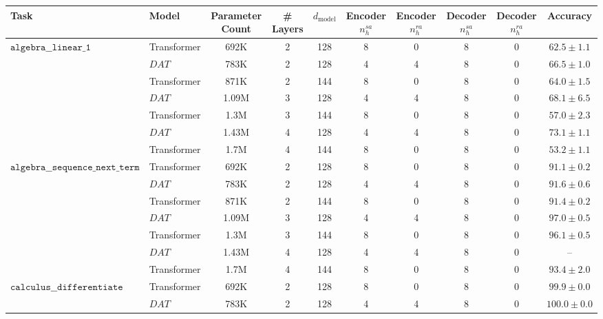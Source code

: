 \begin{tabular}{l|l|ccccccc|c}
\toprule
Task & Model & Parameter Count & \# Layers & $d_{\text{model}}$ & Encoder $n_h^{sa}$ & Encoder $n_h^{ra}$ & Decoder $n_h^{sa}$ & Decoder $n_h^{ra}$ & Accuracy \\
\midrule
\multirow{7}{*}{$\texttt{algebra\_\_linear\_1}$} & Transformer & 692K & 2 & 128 & 8 & 0 & 8 & 0 &   $62.5 \pm 1.1$ \\
                                 & $DAT$ & 783K & 2 & 128 & 4 & 4 & 8 & 0 &   $66.5 \pm 1.0$ \\
                                 & Transformer & 871K & 2 & 144 & 8 & 0 & 8 & 0 &   $64.0 \pm 1.5$ \\
                                 & $DAT$ & 1.09M & 3 & 128 & 4 & 4 & 8 & 0 &   $68.1 \pm 6.5$ \\
                                 & Transformer & 1.3M & 3 & 144 & 8 & 0 & 8 & 0 &   $57.0 \pm 2.3$ \\
                                 & $DAT$ & 1.43M & 4 & 128 & 4 & 4 & 8 & 0 &   $73.1 \pm 1.1$ \\
                                 & Transformer & 1.7M & 4 & 144 & 8 & 0 & 8 & 0 &   $53.2 \pm 1.1$ \\
\cline{1-10}
\multirow{7}{*}{$\texttt{algebra\_\_sequence\_next\_term}$} & Transformer & 692K & 2 & 128 & 8 & 0 & 8 & 0 &   $91.1 \pm 0.2$ \\
                                 & $DAT$ & 783K & 2 & 128 & 4 & 4 & 8 & 0 &   $91.6 \pm 0.6$ \\
                                 & Transformer & 871K & 2 & 144 & 8 & 0 & 8 & 0 &   $91.4 \pm 0.2$ \\
                                 & $DAT$ & 1.09M & 3 & 128 & 4 & 4 & 8 & 0 &   $97.0 \pm 0.5$ \\
                                 & Transformer & 1.3M & 3 & 144 & 8 & 0 & 8 & 0 &   $96.1 \pm 0.5$ \\
                                 & $DAT$ & 1.43M & 4 & 128 & 4 & 4 & 8 & 0 &               -- \\
                                 & Transformer & 1.7M & 4 & 144 & 8 & 0 & 8 & 0 &   $93.4 \pm 2.0$ \\
\cline{1-10}
\multirow{7}{*}{$\texttt{calculus\_\_differentiate}$} & Transformer & 692K & 2 & 128 & 8 & 0 & 8 & 0 &   $99.9 \pm 0.0$ \\
                                 & $DAT$ & 783K & 2 & 128 & 4 & 4 & 8 & 0 &  $100.0 \pm 0.0$ \\

\end{tabular}
